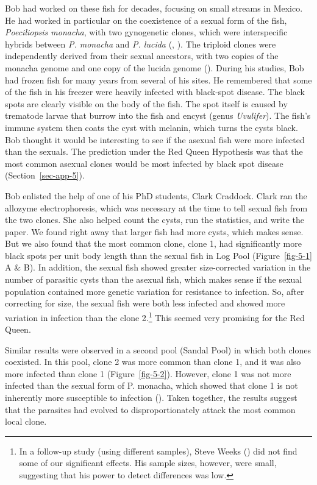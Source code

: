 \documentclass[
  american,
  letterpaper,
]{book}
\begin{document}
Bob had worked on these fish for decades, focusing on small streams in
Mexico. He had worked in particular on the coexistence of a sexual form
of the fish, \emph{Poeciliopsis monacha}, with two gynogenetic clones,
which were interspecific hybrids between \emph{P. monacha} and \emph{P.
lucida} (,
). The triploid clones were
independently derived from their sexual ancestors, with two copies of
the monacha genome and one copy of the lucida genome
(). During his studies, Bob had
frozen fish for many years from several of his sites. He remembered that
some of the fish in his freezer were heavily infected with black-spot
disease. The black spots are clearly visible on the body of the fish.
The spot itself is caused by trematode larvae that burrow into the fish
and encyst (genus \emph{Uvulifer}). The fish's immune system then coats
the cyst with melanin, which turns the cysts black. Bob thought it would
be interesting to see if the asexual fish were more infected than the
sexuals. The prediction under the Red Queen Hypothesis was that the most
common asexual clones would be most infected by black spot disease
(Section~\ref{sec-app-5}).

Bob enlisted the help of one of his PhD students, Clark Craddock. Clark
ran the allozyme electrophoresis, which was necessary at the time to
tell sexual fish from the two clones. She also helped count the cysts,
run the statistics, and write the paper. We found right away that larger
fish had more cysts, which makes sense. But we also found that the most
common clone, clone 1, had significantly more black spots per unit body
length than the sexual fish in Log Pool (Figure~\ref{fig-5-1} A \& B).
In addition, the sexual fish showed greater size-corrected variation in
the number of parasitic cysts than the asexual fish, which makes sense
if the sexual population contained more genetic variation for resistance
to infection. So, after correcting for size, the sexual fish were both
less infected and showed more variation in infection than the clone
2.\footnote{In a follow-up study (using different samples), Steve Weeks
  () did not find some of our significant
  effects. His sample sizes, however, were small, suggesting that his
  power to detect differences was low.} This seemed very promising for
the Red Queen.

Similar results were observed in a second pool (Sandal Pool) in which
both clones coexisted. In this pool, clone 2 was more common than clone
1, and it was also more infected than clone 1 (Figure~\ref{fig-5-2}).
However, clone 1 was not more infected than the sexual form of P.
monacha, which showed that clone 1 is not inherently more susceptible to
infection (). Taken
together, the results suggest that the parasites had evolved to
disproportionately attack the most common local clone.
\end{document}
